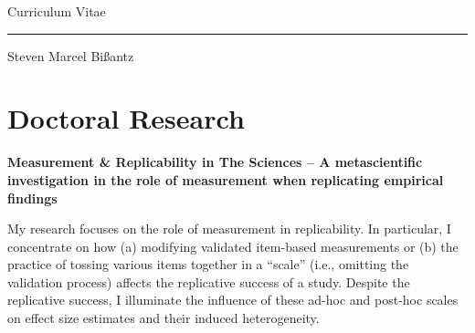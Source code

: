 \documentclass[10pt]{FreemanCV}
\begin{document}
\begin{paracol}{2} %


\parbox[][0.11\textheight][c]{\linewidth}{ 
	\centering %
	{\Huge\textcolor{headings}{Curriculum Vitae}} 

	\par\noindent\rule{6cm}{0.4pt}
	\medskip 

	{\sffamily\Large{Steven Marcel Bißantz}}
	
	\vfill %
}


\section{Doctoral Research}

\textbf{Measurement \& Replicability in The Sciences -- A metascientific investigation in the role of measurement when replicating empirical findings}

\medskip %
My research focuses on the role of measurement in replicability. In particular,
I concentrate on how (a) modifying validated item-based measurements or (b) the
practice of tossing various items together in a \enquote{scale} (i.e., omitting
the validation process) affects the replicative success of a study. Despite the
replicative success, I illuminate the influence of these ad-hoc and post-hoc
scales on effect size estimates and their induced heterogeneity.

\medskip %



\end{paracol}
\end{document}
